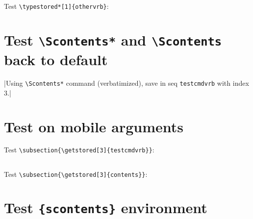 \documentclass{article}
\begin{document}

\noindent\hrulefill

Test \verb+\typestored*[1]{othervrb}+:\par


\noindent\hrulefill

\section{Test \texttt{\textbackslash Scontents*} and \texttt{\textbackslash Scontents} back to default}


\Scontents*|Using \texttt{\textbackslash Scontents*} command (verbatimized), save in seq \texttt{testcmdvrb} with index $3$.|

\section{Test on mobile arguments}

\noindent\hrulefill

Test \verb+\subsection{\getstored[3]{testcmdvrb}}+:\par

\subsection{}

\noindent\hrulefill

Test \verb+\subsection{\getstored[3]{contents}}+:\par

\subsection{}

\noindent\hrulefill

\section{Test \texttt{\{scontents\}} environment}
\end{document}
